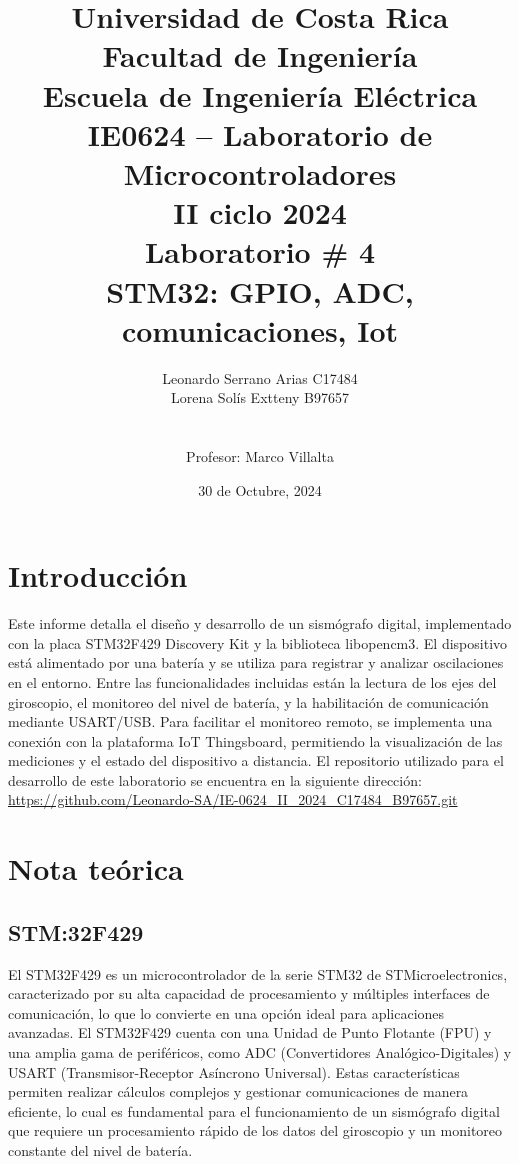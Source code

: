 \documentclass[12pt,a4paper]{article}
\author{ Leonardo Serrano Arias C17484  \\Lorena Solís Extteny B97657\\{\small }\\ \\ Profesor: Marco Villalta  \vspace*{3.0in}}
\title{Universidad de Costa Rica\\{\small Facultad de Ingeniería\\Escuela de Ingeniería Eléctrica\\IE0624 – Laboratorio de Microcontroladores\\II ciclo 2024\\\vspace*{0.55in} Laboratorio \# 4 }\\ STM32: GPIO, ADC, comunicaciones, Iot \vspace*{1.35in}}
\date{30 de Octubre, 2024}
\begin{document}
 

\maketitle  
\thispagestyle{empty}%
\renewcommand{\thepage}{\roman{page}}
\newpage
\tableofcontents

\listoffigures 


\renewcommand{\thepage}{\arabic{page}} 
\setcounter{page}{1}

\newpage
\section{Introducción}
Este informe detalla el diseño y desarrollo de un sismógrafo digital, implementado con la placa STM32F429 Discovery Kit y la biblioteca libopencm3. El dispositivo está alimentado por una batería y se utiliza para registrar y analizar oscilaciones en el entorno. Entre las funcionalidades incluidas están la lectura de los ejes del giroscopio, el monitoreo del nivel de batería, y la habilitación de comunicación mediante USART/USB. Para facilitar el monitoreo remoto, se implementa una conexión con la plataforma IoT Thingsboard, permitiendo la visualización de las mediciones y el estado del dispositivo a distancia.
El repositorio utilizado para el desarrollo de este laboratorio se encuentra en la siguiente dirección: \url{https://github.com/Leonardo-SA/IE-0624_II_2024_C17484_B97657.git}

\section{Nota teórica}

\subsection{STM:32F429}
El STM32F429 \cite{hoja}es un microcontrolador de la serie STM32 de STMicroelectronics, caracterizado por su alta capacidad de procesamiento y múltiples interfaces de comunicación, lo que lo convierte en una opción ideal para aplicaciones avanzadas. El STM32F429 cuenta con una Unidad de Punto Flotante (FPU) y una amplia gama de periféricos, como ADC (Convertidores Analógico-Digitales) y USART (Transmisor-Receptor Asíncrono Universal). Estas características permiten realizar cálculos complejos y gestionar comunicaciones de manera eficiente, lo cual es fundamental para el funcionamiento de un sismógrafo digital que requiere un procesamiento rápido de los datos del giroscopio y un monitoreo constante del nivel de batería.
\end{document}
